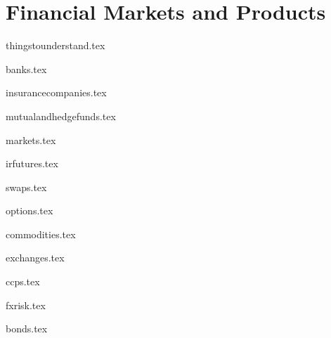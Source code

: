 \documentclass{report}
\begin{document}
	

\tableofcontents		

\part{Financial Markets and Products}

{thingstounderstand.tex}
\pagebreak

{banks.tex}
\pagebreak

{insurancecompanies.tex}
\pagebreak

{mutualandhedgefunds.tex}
\pagebreak

{markets.tex}
\pagebreak

{irfutures.tex}
\pagebreak

{swaps.tex}
\pagebreak

{options.tex}
\pagebreak

{commodities.tex}
\pagebreak

{exchanges.tex}
\pagebreak

{ccps.tex}
\pagebreak

{fxrisk.tex}
\pagebreak

{bonds.tex}
\pagebreak
\end{document}

